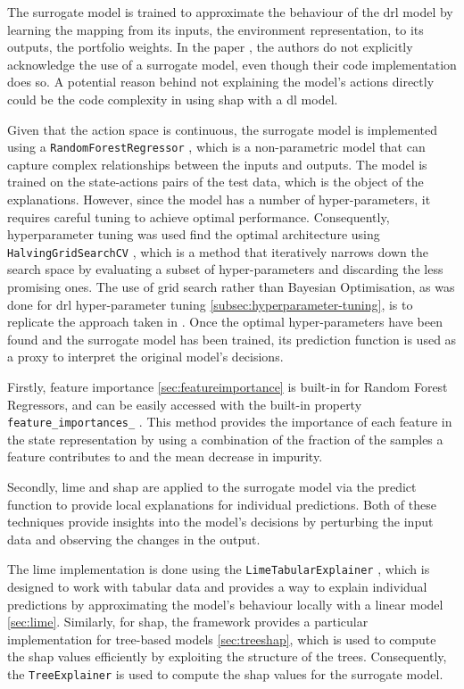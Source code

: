 The surrogate model is trained to approximate the behaviour of the \acrshort{drl} model by learning the mapping from its inputs, the environment representation, to its outputs, the portfolio weights. In the paper \cite{de-La-Rica-Escudero2025}, the authors do not explicitly acknowledge the use of a surrogate model, even though their code implementation does so. A potential reason behind not explaining the model's actions directly could be the code complexity in using \acrshort{shap} with a \acrshort{dl} model. 

Given that the action space is continuous, the surrogate model is implemented using a \texttt{RandomForestRegressor} \cite{sklearnRandomForest}, which is a non-parametric model that can capture complex relationships between the inputs and outputs. The model is trained on the state-actions pairs of the test data, which is the object of the explanations. However, since the model has a number of hyper-parameters, it requires careful tuning to achieve optimal performance. Consequently, hyperparameter tuning was used find the optimal architecture using \texttt{HalvingGridSearchCV} \cite{sklearnHalvingGridSearch}, which is a method that iteratively narrows down the search space by evaluating a subset of hyper-parameters and discarding the less promising ones. The use of grid search rather than Bayesian Optimisation, as was done for \acrshort{drl} hyper-parameter tuning \ref{subsec:hyperparameter-tuning}, is to replicate the approach taken in \cite{de-La-Rica-Escudero2025}. Once the optimal hyper-parameters have been found and the surrogate model has been trained, its prediction function is used as a proxy to interpret the original model's decisions.

Firstly, feature importance \ref{sec:featureimportance} is built-in for Random Forest Regressors, and can be easily accessed with the built-in property \texttt{feature\_importances\_} \cite{sklearnFeatureImportance}. This method provides the importance of each feature in the state representation by using a combination of the fraction of the samples a feature contributes to and the mean decrease in impurity.

Secondly, \acrshort{lime} and \acrshort{shap} are applied to the surrogate model via the predict function to provide local explanations for individual predictions. Both of these techniques provide insights into the model's decisions by perturbing the input data and observing the changes in the output. 

The \acrshort{lime} implementation is done using the \texttt{LimeTabularExplainer} \cite{LimeTabularExplainer}, which is designed to work with tabular data and provides a way to explain individual predictions by approximating the model's behaviour locally with a linear model \ref{sec:lime}. Similarly, for \acrshort{shap}, the framework provides a particular implementation for tree-based models \ref{sec:treeshap}, which is used to compute the \acrshort{shap} values efficiently by exploiting the structure of the trees. Consequently, the \texttt{TreeExplainer} \cite{ShapTreeExplainer} is used to compute the \acrshort{shap} values for the surrogate model.


